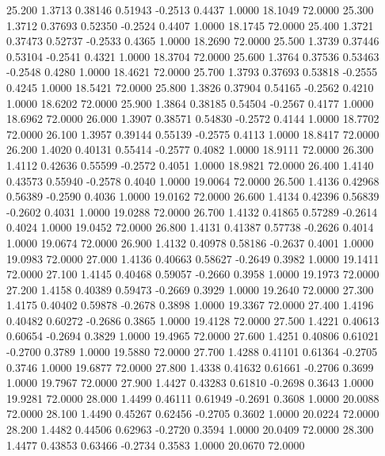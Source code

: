   25.200   1.3713   0.38146   0.51943  -0.2513   0.4437   1.0000  18.1049  72.0000
  25.300   1.3712   0.37693   0.52350  -0.2524   0.4407   1.0000  18.1745  72.0000
  25.400   1.3721   0.37473   0.52737  -0.2533   0.4365   1.0000  18.2690  72.0000
  25.500   1.3739   0.37446   0.53104  -0.2541   0.4321   1.0000  18.3704  72.0000
  25.600   1.3764   0.37536   0.53463  -0.2548   0.4280   1.0000  18.4621  72.0000
  25.700   1.3793   0.37693   0.53818  -0.2555   0.4245   1.0000  18.5421  72.0000
  25.800   1.3826   0.37904   0.54165  -0.2562   0.4210   1.0000  18.6202  72.0000
  25.900   1.3864   0.38185   0.54504  -0.2567   0.4177   1.0000  18.6962  72.0000
  26.000   1.3907   0.38571   0.54830  -0.2572   0.4144   1.0000  18.7702  72.0000
  26.100   1.3957   0.39144   0.55139  -0.2575   0.4113   1.0000  18.8417  72.0000
  26.200   1.4020   0.40131   0.55414  -0.2577   0.4082   1.0000  18.9111  72.0000
  26.300   1.4112   0.42636   0.55599  -0.2572   0.4051   1.0000  18.9821  72.0000
  26.400   1.4140   0.43573   0.55940  -0.2578   0.4040   1.0000  19.0064  72.0000
  26.500   1.4136   0.42968   0.56389  -0.2590   0.4036   1.0000  19.0162  72.0000
  26.600   1.4134   0.42396   0.56839  -0.2602   0.4031   1.0000  19.0288  72.0000
  26.700   1.4132   0.41865   0.57289  -0.2614   0.4024   1.0000  19.0452  72.0000
  26.800   1.4131   0.41387   0.57738  -0.2626   0.4014   1.0000  19.0674  72.0000
  26.900   1.4132   0.40978   0.58186  -0.2637   0.4001   1.0000  19.0983  72.0000
  27.000   1.4136   0.40663   0.58627  -0.2649   0.3982   1.0000  19.1411  72.0000
  27.100   1.4145   0.40468   0.59057  -0.2660   0.3958   1.0000  19.1973  72.0000
  27.200   1.4158   0.40389   0.59473  -0.2669   0.3929   1.0000  19.2640  72.0000
  27.300   1.4175   0.40402   0.59878  -0.2678   0.3898   1.0000  19.3367  72.0000
  27.400   1.4196   0.40482   0.60272  -0.2686   0.3865   1.0000  19.4128  72.0000
  27.500   1.4221   0.40613   0.60654  -0.2694   0.3829   1.0000  19.4965  72.0000
  27.600   1.4251   0.40806   0.61021  -0.2700   0.3789   1.0000  19.5880  72.0000
  27.700   1.4288   0.41101   0.61364  -0.2705   0.3746   1.0000  19.6877  72.0000
  27.800   1.4338   0.41632   0.61661  -0.2706   0.3699   1.0000  19.7967  72.0000
  27.900   1.4427   0.43283   0.61810  -0.2698   0.3643   1.0000  19.9281  72.0000
  28.000   1.4499   0.46111   0.61949  -0.2691   0.3608   1.0000  20.0088  72.0000
  28.100   1.4490   0.45267   0.62456  -0.2705   0.3602   1.0000  20.0224  72.0000
  28.200   1.4482   0.44506   0.62963  -0.2720   0.3594   1.0000  20.0409  72.0000
  28.300   1.4477   0.43853   0.63466  -0.2734   0.3583   1.0000  20.0670  72.0000
